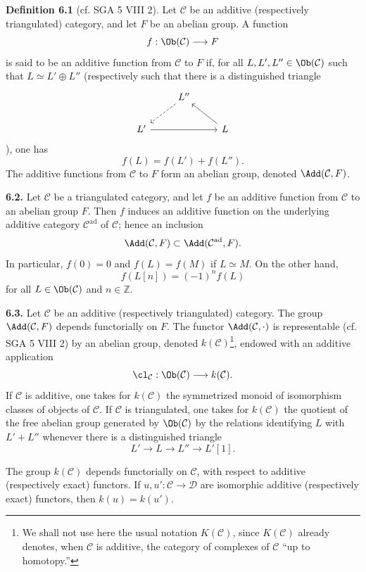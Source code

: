\textbf{Definition 6.1} (cf. SGA 5 VIII 2). Let \(\mathcal C\) be an additive (respectively triangulated) category, and let \(F\) be an abelian group. A function
\[
  f:\Ob(\mathcal C)\longrightarrow F
\]
is said to be an additive function from \(\mathcal C\) to \(F\) if, for all \(L,L',L''\in\Ob(\mathcal C)\) such that \(L\simeq L'\oplus L''\) (respectively such that there is a distinguished triangle
\[
\begin{tikzcd}
& L'' \arrow[dl,dashed] & \\
L' \arrow[rr] && L \arrow[ul]
\end{tikzcd}
\]
), one has
\[
  f(L)=f(L')+f(L'').
\]
The additive functions from \(\mathcal C\) to \(F\) form an abelian group, denoted \(\Add(\mathcal C,F)\).

\textbf{6.2.} Let \(\mathcal C\) be a triangulated category, and let \(f\) be an additive function from \(\mathcal C\) to an abelian group \(F\). Then \(f\) induces an additive function on the underlying additive category \(\mathcal C^{\mathrm{ad}}\) of \(\mathcal C\); hence an inclusion
\[
  \Add(\mathcal C,F)\subset \Add(\mathcal C^{\mathrm{ad}},F).
\]
In particular, \(f(0)=0\) and \(f(L)=f(M)\) if \(L\simeq M\). On the other hand,
\[
  f(L[n])=(-1)^n f(L)
\]
for all \(L\in\Ob(\mathcal C)\) and \(n\in\mathbb Z\).

\textbf{6.3.} Let \(\mathcal C\) be an additive (respectively triangulated) category. The group \(\Add(\mathcal C,F)\) depends functorially on \(F\). The functor \(\Add(\mathcal C,\cdot)\) is representable (cf. SGA 5 VIII 2) by an abelian group, denoted \(k(\mathcal C)\)\footnote{We shall not use here the usual notation \(K(\mathcal C)\), since \(K(\mathcal C)\) already denotes, when \(\mathcal C\) is additive, the category of complexes of \(\mathcal C\) ``up to homotopy.''}, endowed with an additive application
\[
  \cl_{\mathcal C}:\Ob(\mathcal C)\longrightarrow k(\mathcal C).
\]
If \(\mathcal C\) is additive, one takes for \(k(\mathcal C)\) the symmetrized monoid of isomorphism classes of objects of \(\mathcal C\). If \(\mathcal C\) is triangulated, one takes for \(k(\mathcal C)\) the quotient of the free abelian group generated by \(\Ob(\mathcal C)\) by the relations identifying \(L\) with \(L'+L''\) whenever there is a distinguished triangle
\[
  L'\longrightarrow L\longrightarrow L''\longrightarrow L'[1].
\]

The group \(k(\mathcal C)\) depends functorially on \(\mathcal C\), with respect to additive (respectively exact) functors. If \(u,u':\mathcal C\to\mathcal D\) are isomorphic additive (respectively exact) functors, then \(k(u)=k(u')\).

